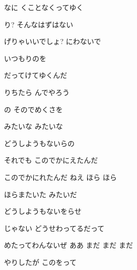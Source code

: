 \documentclass[a4paper,tate,twocolumn,12pt]{ltjtarticle}
\begin{document}
\begin{flushleft}
\begin{minipage}{\linewidth}
なに くことなくってゆく

り? そんなはずはない

げりゃいいでしょ? にわないで
\end{minipage}

\vspace{2em}

\noindent\begin{minipage}{\linewidth}
いつもりのを

だってけてゆくんだ

りちたら んでやろう

の そのでめくさを
\end{minipage}

\vspace{2em}

\noindent\begin{minipage}{\linewidth}
みたいな みたいな

どうしようもないらの

それでも このでかにえたんだ

このでかにれたんだ ねえ ほら ほら
\end{minipage}

\vspace{2em}

\noindent\begin{minipage}{\linewidth}
ほらまたいた みたいだ

どうしようもないをらせ

じゃない どうせわってるだって

めたってわんないぜ ああ まだ まだ まだ
\end{minipage}

\vspace{2em}

\noindent\begin{minipage}{\linewidth}
やりしたが このをって


\end{minipage}
\end{flushleft}
\end{document}
